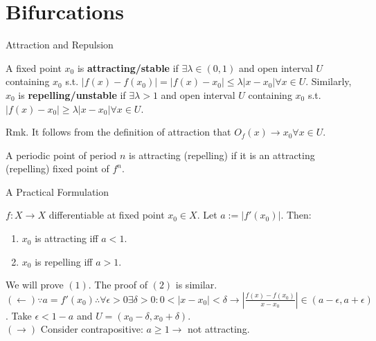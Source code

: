 \documentclass[aspectratio=169]{beamer}
\begin{document}
\section{Bifurcations}
\frame{\sectionpage}

\begin{frame}{Attraction and Repulsion}
    \begin{defn}
        A fixed point $x_0$ is \textbf{attracting/stable} if $\exists \lambda \in (0,1)$ and open interval $U$ containing $x_0$ s.t. $|f(x)-f(x_0)|=|f(x)-x_0| \leq \lambda|x-x_0| \forall x\in U$. Similarly, $x_0$ is \textbf{repelling/unstable} if $\exists \lambda>1$ and open interval $U$ containing $x_0$ s.t. $|f(x)-x_0| \geq \lambda|x-x_0| \forall x\in U$. 
    \end{defn}
    Rmk. It follows from the definition of attraction that $O_f(x) \rightarrow x_0 \forall x \in U$.
    \begin{defn}
        A periodic point of period $n$ is attracting (repelling) if it is an attracting (repelling) fixed point of $f^n$. 
    \end{defn}
\end{frame}

\begin{frame}{A Practical Formulation}
    \begin{thrm}
        $f:X\rightarrow X$ differentiable at fixed point $x_0 \in X$. Let $a := |f'(x_0)|$. Then: 
        \begin{enumerate}
            \item $x_0$ is attracting iff $a<1$. 
            \item $x_0$ is repelling iff $a>1$. 
        \end{enumerate}
    \end{thrm}
    \begin{pf}
        We will prove $(1)$. The proof of $(2)$ is similar. \\
        $(\leftarrow) \because a = f'(x_0) \therefore \forall \epsilon >0 \exists \delta >0 : 0<|x-x_0|<\delta \rightarrow |\frac{f(x)-f(x_0)}{x-x_0}| \in (a-\epsilon, a+\epsilon)$. Take $\epsilon < 1-a$ and $U = (x_0-\delta, x_0+\delta)$. \\
        $(\rightarrow)$ Consider contrapositive: $a\geq 1 \rightarrow$ not attracting. 
    \end{pf}
\end{frame}
\end{document}
